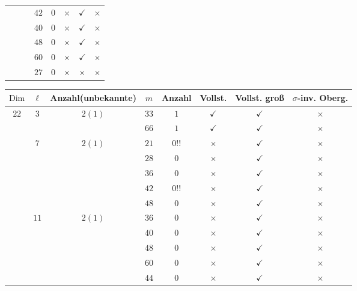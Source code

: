 \documentclass[12pt,a4paper,halfparskip,headsepline,bibtotocnumbered]{scrreprt}
\theoremstyle{nummermitklammern}
\theoremstyle{nonumberbreak}
\newcommand{\Dim}{\text{Dim}}
\begin{document}
\begin{table}[H]
\begin{tabular}{|c|c|c|c|c|c|c|c|}
								&						&							&$42$	&$0$	&$\times$		&$\checkmark$	&$\times$\\ \cline{4-8}
								&						&							&$40$	&$0$	&$\times$		&$\checkmark$	&$\times$\\ \cline{4-8}
								&						&							&$48$	&$0$	&$\times$		&$\checkmark$	&$\times$\\ \cline{4-8}
								&						&							&$60$	&$0$	&$\times$		&$\checkmark$	&$\times$\\ \cline{4-8}
								&						&							&$27$	&$0$	&$\times$		&$\times$		&$\times$\\ \hline
	\end{tabular}
\end{table}

\begin{table}[H]
	\centering
	\begin{tabular}{|c|c|c|c|c|c|c|c|}
		\hline		
		$\Dim$					&$\ell$					&{Anzahl(unbekannte)}		&$m$	&Anzahl	&Vollst.	&Vollst. groß	&$\sigma$-inv. Oberg.\\ \hline
		\multirow{12}{*}{$22$}	&\multirow{2}{*}{$3$}	&\multirow{2}{*}{$2(1)$}	&$33$	&$1$	&$\checkmark$	&$\checkmark$	&$\times$\\ \cline{4-8}
								&						&							&$66$	&$1$	&$\checkmark$	&$\checkmark$	&$\times$\\ \cline{2-8}
								&\multirow{5}{*}{$7$}	&\multirow{5}{*}{$2(1)$}	&$21$	&$0!!$	&$\times$		&$\checkmark$	&$\times$\\ \cline{4-8}
								&						&							&$28$	&$0$	&$\times$		&$\checkmark$	&$\times$\\ \cline{4-8}
								&						&							&$36$	&$0$	&$\times$		&$\checkmark$	&$\times$\\ \cline{4-8}
								&						&							&$42$	&$0!!$	&$\times$		&$\checkmark$	&$\times$\\ \cline{4-8}
								&						&							&$48$	&$0$	&$\times$		&$\checkmark$	&$\times$\\ \cline{2-8}
								&\multirow{5}{*}{$11$}&\multirow{5}{*}{$2(1)$}		&$36$	&$0$	&$\times$		&$\checkmark$	&$\times$\\ \cline{4-8}
								&						&							&$40$	&$0$	&$\times$		&$\checkmark$	&$\times$\\ \cline{4-8}
								&						&							&$48$	&$0$	&$\times$		&$\checkmark$	&$\times$\\ \cline{4-8}
								&						&							&$60$	&$0$	&$\times$		&$\checkmark$	&$\times$\\ \cline{4-8}
								&						&							&$44$	&$0$	&$\times$		&$\checkmark$	&$\times$\\ \hline

\end{tabular}
\end{table}
\end{document}
